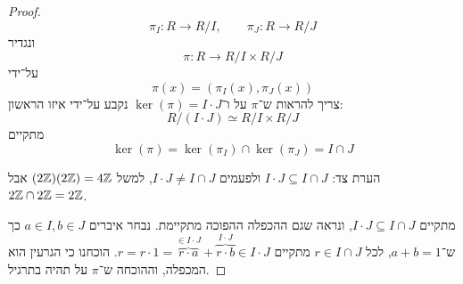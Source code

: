 \begin{proof}
	\[
		\pi_I : R \to R / I,
		\qquad
		\pi_J : R \to R / J
	\]
	ונגדיר
	\[
		\pi : R \to R / I \times R / J
	\]
	על־ידי
	\[
		\pi(x) = (\pi_I(x), \pi_J(x))
	\]
	צריך להראות ש־$\pi$ על ו־$\ker(\pi) = I \cdot J$ נקבע על־ידי איזו הראשון:
	\[
		R / (I \cdot J) \simeq R  / I \times R / J
	\]
	מתקיים
	\[
		\ker(\pi) = \ker(\pi_I) \cap \ker(\pi_J) = I \cap J
	\]

	הערת צד: $I \cdot J \subseteq I \cap J$ ולפעמים $I \cdot J \ne I \cap J$, למשל $(2 \mathbb{Z})(2\mathbb{Z}) = 4 \mathbb{Z}$ אבל $2\mathbb{Z} \cap 2\mathbb{Z} = 2\mathbb{Z}$.

	מתקיים $I \cdot J \subseteq I \cap J$, ונראה שגם ההכפלה ההפוכה מתקיימת.
	נבחר איברים $a \in I, b \in J$ כך ש־$a + b = 1$, לכל $r \in I \cap J$ מתקיים $r = r \cdot 1 = \overbrace{r \cdot a}^{\in I \cdot J} + \overbrace{r \cdot b}^{I \cdot J} \in I \cdot J$.
	הוכחנו כי הגרעין הוא המכפלה, וההוכחה ש־$\pi$ על תהיה בתרגיל.
\end{proof}

